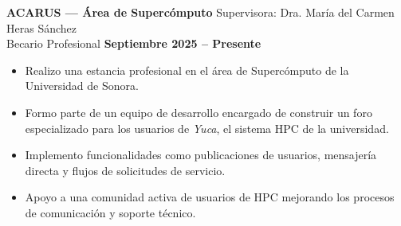 \documentclass[11pt]{article}
\begin{document}
\vspace{0.2cm}
\textbf{ACARUS — Área de Supercómputo} \hfill Supervisora: Dra. María del Carmen Heras Sánchez\\
Becario Profesional \hfill \textbf{Septiembre 2025 -- Presente}
\vspace{-0.3cm}
\begin{itemize}[leftmargin=*]
    \item Realizo una estancia profesional en el área de Supercómputo de la Universidad de Sonora.
    
    \vspace{-0.3cm}
    \item Formo parte de un equipo de desarrollo encargado de construir un foro especializado para los usuarios de \textit{Yuca}, el sistema HPC de la universidad.
    
    \vspace{-0.3cm}
    \item Implemento funcionalidades como publicaciones de usuarios, mensajería directa y flujos de solicitudes de servicio.

    \vspace{-0.3cm}
    \item Apoyo a una comunidad activa de usuarios de HPC mejorando los procesos de comunicación y soporte técnico.
\end{itemize}


\end{document}
